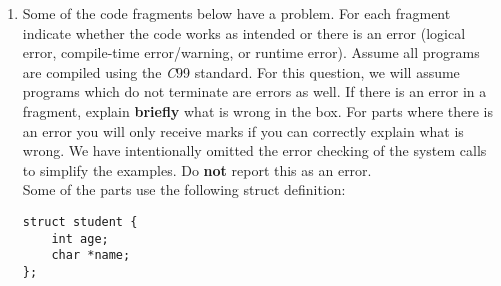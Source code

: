 \documentclass[11pt]{article}
\begin{document}
\begin{enumerate}
\begin{tabular}[c]{| l | l | l |}
\begin{minipage}{0.3\textwidth}
\begin{Verbatim}
struct node y;










				\end{Verbatim}
			\end{minipage}\\
			\hline
			\begin{minipage}{0.3\textwidth}
				\begin{Verbatim}

char fun(char *str, int n) {
	return str[n];
}
y = fun("hello", 1);
x = &y;

				\end{Verbatim}
			\end{minipage} &
			\begin{minipage}[t]{0.3\textwidth}
				\begin{Verbatim}

ERROR: fun has wrong
return type

				\end{Verbatim}
			\end{minipage} &
			\begin{minipage}[t]{0.3\textwidth}
				\begin{Verbatim}

ERROR: fun has wrong
return type

				\end{Verbatim}
			\end{minipage}\\
			\hline
		\end{tabular}

	\newpage
	\item Some of the code fragments below have a problem. For each fragment indicate whether the code works as intended or there is an error (logical error, compile-time error/warning, or runtime error). Assume all programs are compiled using the \textit{C}99 standard. For this question, we will assume programs which do not terminate are errors as well. If there is an error in a fragment, explain \textbf{briefly} what is wrong in the box. For parts where there is an error you will only receive marks if you can correctly explain what is wrong. We have intentionally omitted the error checking of the system calls to simplify the examples. Do \textbf{not} report this as an error.\\
	Some of the parts use the following struct definition:
	\begin{Verbatim}
struct student {
	int age;
	char *name;
};
	\end{Verbatim}



\end{enumerate}
\end{document}
